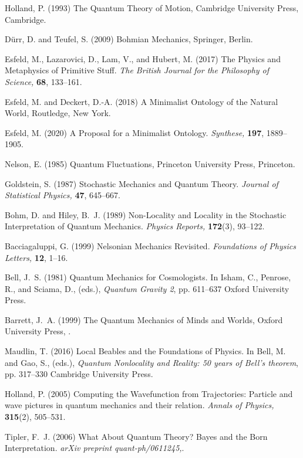 \documentclass[12pt,onecolumn,secnumarabic,amsmath,amssymb,balancelastpage,nofootinbib]{article}
\begin{document}
\begin{thebibliography}{100}
Holland, P. (1993)
The Quantum Theory of Motion,
Cambridge University Press, Cambridge.

D\"{u}rr, D. and Teufel, S. (2009)
Bohmian Mechanics,
Springer, Berlin.

Esfeld, M., Lazarovici, D., Lam, V., and Hubert, M. (2017)
The Physics and Metaphysics of Primitive Stuff.
{\em The British Journal for the Philosophy of Science,} {\bf 68}, 133--161.

Esfeld, M. and Deckert, D.-A. (2018)
A Minimalist Ontology of the Natural World,
Routledge, New York.

Esfeld, M. (2020)
A Proposal for a Minimalist Ontology.
{\em Synthese,} {\bf 197}, 1889--1905.

Nelson, E. (1985)
Quantum Fluctuations,
Princeton University Press, Princeton.

Goldstein, S. (1987)
Stochastic Mechanics and Quantum Theory.
{\em Journal of Statistical Physics,} {\bf 47}, 645--667.

Bohm, D. and Hiley, B.~J. (1989)
Non-Locality and Locality in the Stochastic Interpretation of Quantum
  Mechanics.
{\em Physics Reports,} {\bf 172}(3), 93--122.

Bacciagaluppi, G. (1999)
Nelsonian Mechanics Revisited.
{\em Foundations of Physics Letters,} {\bf 12}, 1--16.

Bell, J.~S. (1981)
Quantum Mechanics for Cosmologists.
In Isham, C., Penrose, R., and Sciama, D., (eds.), \emph{Quantum Gravity 2},
  pp. 611--637 Oxford University Press.

Barrett, J.~A. (1999)
The Quantum Mechanics of Minds and Worlds,
Oxford University Press, .

Maudlin, T. (2016)
Local Beables and the Foundations of Physics.
In Bell, M. and Gao, S., (eds.), \emph{Quantum Nonlocality and Reality: 50
  years of Bell's theorem},  pp. 317--330 Cambridge University Press.

Holland, P. (2005)
Computing the Wavefunction from Trajectories: Particle and wave pictures in
  quantum mechanics and their relation.
{\em Annals of Physics,} {\bf 315}(2), 505--531.

Tipler, F.~J. (2006)
What About Quantum Theory? Bayes and the Born Interpretation.
{\em arXiv preprint quant-ph/0611245,}.


\end{thebibliography}
\end{document}
